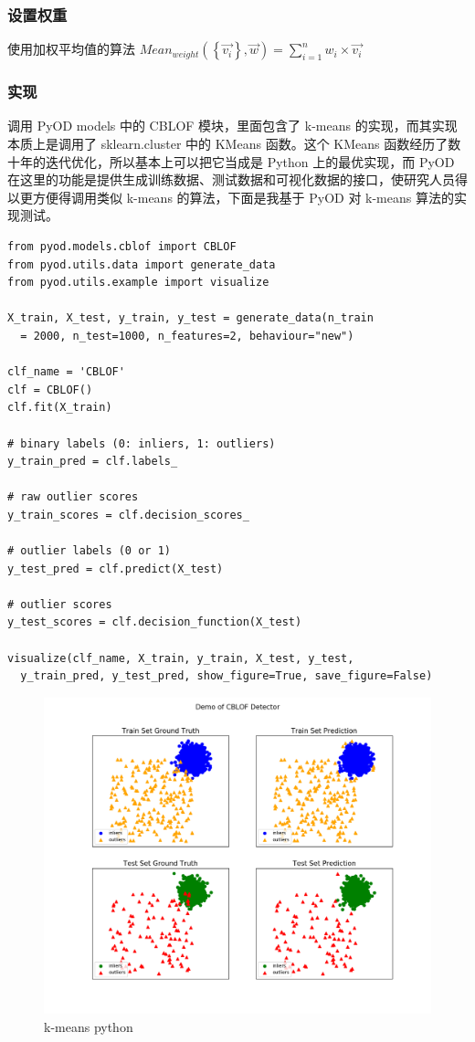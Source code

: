 \documentclass[UTF8]{ctexart}
\begin{document}
        \subsubsection{设置权重}
            使用加权平均值的算法 \( Mean_{weight}\left(\left\{\overrightarrow{v_{i}}\right\}, \vec{w}\right)=\sum_{i=1}^{n} w_{i} \times \overrightarrow{v_{i}} \)

        \subsubsection{实现}
            调用 PyOD models 中的 CBLOF 模块，里面包含了 k-means 的实现，而其实现本质上是调用了 sklearn.cluster 中的 KMeans 函数。这个 KMeans 函数经历了数十年的迭代优化，所以基本上可以把它当成是 Python 上的最优实现，而 PyOD 在这里的功能是提供生成训练数据、测试数据和可视化数据的接口，使研究人员得以更方便得调用类似 k-means 的算法，下面是我基于 PyOD 对 k-means 算法的实现测试。

\begin{lstlisting}[style=stylePy]
from pyod.models.cblof import CBLOF  
from pyod.utils.data import generate_data
from pyod.utils.example import visualize

X_train, X_test, y_train, y_test = generate_data(n_train
  = 2000, n_test=1000, n_features=2, behaviour="new")

clf_name = 'CBLOF'
clf = CBLOF()
clf.fit(X_train)

# binary labels (0: inliers, 1: outliers)
y_train_pred = clf.labels_  

# raw outlier scores
y_train_scores = clf.decision_scores_  

# outlier labels (0 or 1)
y_test_pred = clf.predict(X_test)  

# outlier scores
y_test_scores = clf.decision_function(X_test)  

visualize(clf_name, X_train, y_train, X_test, y_test,
  y_train_pred, y_test_pred, show_figure=True, save_figure=False)
\end{lstlisting}
\begin{figure}[ht]
\centering
\includegraphics[scale=0.5]{kmeans_py1.png}
\caption{k-means python}
\end{figure}
\end{document}
